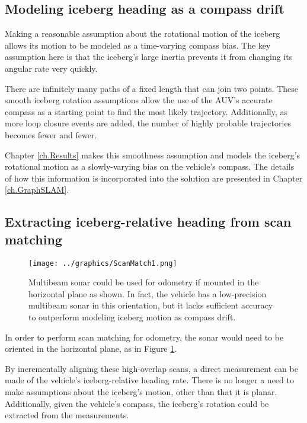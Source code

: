 \subsection{Modeling iceberg heading as a compass drift}

Making a reasonable assumption about the rotational motion of the iceberg allows its motion to be modeled as a time-varying compass bias. The key assumption here is that the iceberg's large inertia prevents it from changing its angular rate very quickly. 

There are infinitely many paths of a fixed length that can join two points. These smooth iceberg rotation assumptions allow the use of the AUV's accurate compass as a starting point to find the most likely trajectory. Additionally, as more loop closure events are added, the number of highly probable trajectories becomes fewer and fewer.

Chapter \ref{ch.Results} makes this smoothness assumption and models the iceberg's rotational motion as a slowly-varying bias on the vehicle's compass. The details of how this information is incorporated into the solution are presented in Chapter \ref{ch.GraphSLAM}.

\subsection{Extracting iceberg-relative heading from scan matching}

\begin{figure}[h]
   \centering
   \texttt{[image: ../graphics/ScanMatch1.png]} %
   \caption{Multibeam sonar could be used for odometry if mounted in the horizontal plane as shown. In fact, the vehicle has a low-precision multibeam sonar in this orientation, but it lacks sufficient accuracy to outperform modeling iceberg motion as compass drift.}
   \label{fig:ScanMatchMultibeam}
\end{figure}

In order to perform scan matching for odometry, the sonar would need to be oriented in the horizontal plane, as in Figure \ref{fig:ScanMatchMultibeam}. 

By incrementally aligning these high-overlap scans, a direct measurement can be made of the vehicle's iceberg-relative heading rate. There is no longer a need to make assumptions about the iceberg's motion, other than that it is planar. Additionally, given the vehicle's compass, the iceberg's rotation could be extracted from the measurements.

